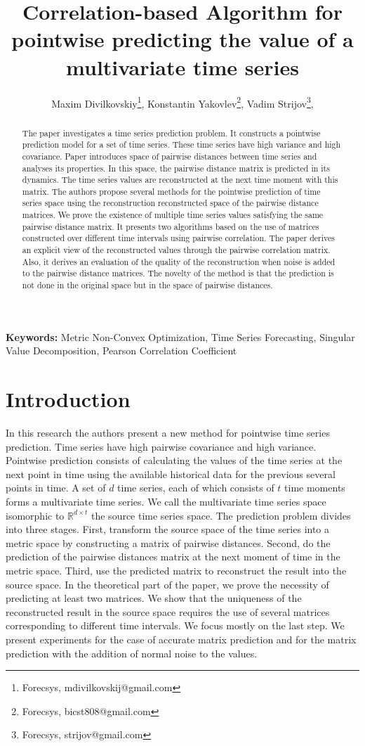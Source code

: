 \documentclass[12pt]{article}
\title{Correlation-based Algorithm for pointwise predicting the value of a multivariate time series}
\author{%
	Maxim Divilkovskiy\footnote{Forecsys, mdivilkovskij@gmail.com},  %
	Konstantin Yakovlev\footnote{Forecsys,  bicst808@gmail.com},  %
	Vadim Strijov\footnote{Forecsys,  strijov@gmail.com},  %
}
\begin{document}
\maketitle

\begin{abstract}
The paper investigates a time series prediction problem. It constructs a pointwise prediction model for a set of time series. These time series have high variance and high covariance. Paper introduces space of pairwise distances between time series and analyses its properties. In this space, the pairwise distance matrix is predicted in its dynamics. The time series values are reconstructed at the next time moment with this matrix. The authors propose several methods for the pointwise prediction of time series space using the reconstruction reconstructed space of the pairwise distance matrices. We prove the existence of multiple time series values satisfying the same pairwise distance matrix. It presents two algorithms based on the use of matrices constructed over different time intervals using pairwise correlation. The paper derives an explicit view of the reconstructed values through the pairwise correlation matrix. Also, it derives an evaluation of the quality of the reconstruction when noise is added to the pairwise distance matrices. The novelty of the method is that the prediction is not done in the original space but in the space of pairwise distances.


\end{abstract}

\textbf{Keywords:} Metric Non-Convex Optimization, Time Series Forecasting, Singular Value Decomposition, Pearson Correlation Coefficient

\section{Introduction}
 	In this research the authors present a new method for pointwise time series prediction. Time series have high pairwise covariance and high variance. Pointwise prediction consists of calculating the values of the time series at the next point in time using the available historical data for the previous several points in time. A set of $d$ time series, each of which consists of $t$ time moments forms a multivariate time series. We call the multivariate time series space isomorphic to $\mathbb{R}^{d \times t}$ the source time series space. The prediction problem divides into three stages. First, transform the source space of the time series into a metric space by constructing a matrix of pairwise distances. Second, do the prediction of the pairwise distances matrix at the next moment of time in the metric space. Third, use the predicted matrix to reconstruct the result into the source space. In the theoretical part of the paper, we prove the necessity of predicting at least two matrices. We show that the uniqueness of the reconstructed result in the source space requires the use of several matrices corresponding to different time intervals. We focus mostly on the last step. We present experiments for the case of accurate matrix prediction and for the matrix prediction with the addition of normal noise to the values.
\end{document}
